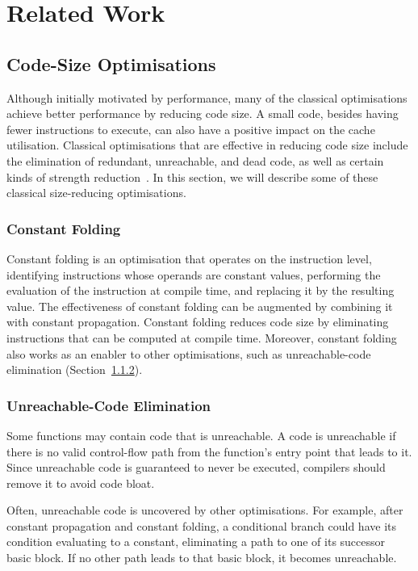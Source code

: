 \chapter{Related Work}

\section{Code-Size Optimisations}

Although initially motivated by performance, many of the classical optimisations achieve better performance by reducing code size.
A small code, besides having fewer instructions to execute, can also have a positive impact on the cache utilisation.
Classical optimisations that are effective in reducing code size include the elimination of redundant, unreachable, and dead code, as well as certain kinds of strength reduction~\cite{cocke70,briggs97,debray00}.
In this section, we will describe some of these classical size-reducing optimisations.

\subsection{Constant Folding}

Constant folding is an optimisation that operates on the instruction level, identifying instructions whose operands are constant values, performing the evaluation of the instruction at compile time, and replacing it by the resulting value.
The effectiveness of constant folding can be augmented by combining it with constant propagation.
Constant folding reduces code size by eliminating instructions that can be computed at compile time.
Moreover, constant folding also works as an enabler to other optimisations, such as unreachable-code elimination (Section~\ref{sec:relatedwork:unreachable}).
 
\subsection{Unreachable-Code Elimination} \label{sec:relatedwork:unreachable}

Some functions may contain code that is unreachable. A code is unreachable if there is no valid control-flow path from the function's entry point that leads to it.
Since unreachable code is guaranteed to never be executed, compilers should remove it to avoid code bloat.

Often, unreachable code is uncovered by other optimisations.
For example, after constant propagation and constant folding, a conditional branch could have its condition evaluating to a constant, eliminating a path to one of its successor basic block.
If no other path leads to that basic block, it becomes unreachable.

